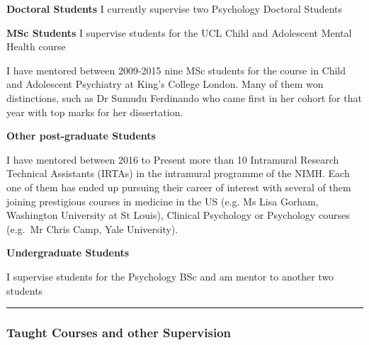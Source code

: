 \documentclass[
]{article}
\begin{document}
\textbf{Doctoral Students} I currently supervise two Psychology Doctoral
Students

\textbf{MSc Students} I supervise students for the UCL Child and
Adolescent Mental Health course

I have mentored between 2009-2015 nine MSc students for the course in
Child and Adolescent Psychiatry at King's College London. Many of them
won distinctions, such as Dr Sumudu Ferdinando who came first in her
cohort for that year with top marks for her dissertation.

\textbf{Other post-graduate Students}

I have mentored between 2016 to Present more than 10 Intramural Research
Technical Assistants (IRTAs) in the intramural programme of the NIMH.
Each one of them has ended up pursuing their career of interest with
several of them joining prestigious courses in medicine in the US (e.g.
Ms Lisa Gorham, Washington University at St Louis), Clinical Psychology
or Psychology courses (e.g.~Mr Chris Camp, Yale University).

\textbf{Undergraduate Students}

I supervise students for the Psychology BSc and am mentor to another two
students

\begin{center}\rule{0.5\linewidth}{0.5pt}\end{center}

\hypertarget{taught-courses-and-other-supervision}{%
\subsubsection{Taught Courses and other
Supervision}\label{taught-courses-and-other-supervision}}
\end{document}
